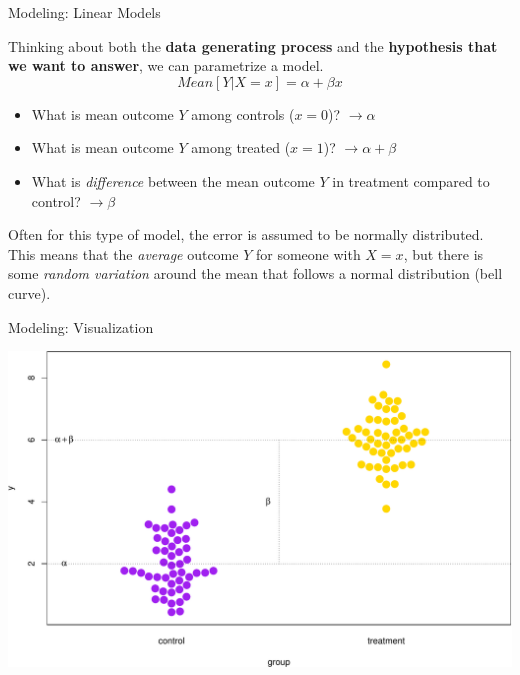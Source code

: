 \documentclass[ignorenonframetext,]{beamer}
\providecommand{\tightlist}{%
  \setlength{\itemsep}{0pt}\setlength{\parskip}{0pt}}
\begin{document}
\begin{frame}{Modeling: Linear Models}
\protect\hypertarget{modeling-linear-models-1}{}

Thinking about both the \textbf{data generating process} and the
\textbf{hypothesis that we want to answer}, we can parametrize a model.
\[
Mean[Y|X=x] = \alpha + \beta x
\]

\begin{itemize}
\tightlist
\item
  What is mean outcome \(Y\) among controls (\(x = 0\))? \(\to \alpha\)
\item
  What is mean outcome \(Y\) among treated (\(x = 1\))?
  \(\to \alpha + \beta\)
\item
  What is \emph{difference} between the mean outcome \(Y\) in treatment
  compared to control? \(\to \beta\)
\end{itemize}

Often for this type of model, the error is assumed to be normally
distributed. This means that the \emph{average} outcome \(Y\) for
someone with \(X = x\), but there is some \emph{random variation} around
the mean that follows a normal distribution (bell curve).

\end{frame}

\begin{frame}{Modeling: Visualization}
\protect\hypertarget{modeling-visualization}{}

\includegraphics{biostats_I_files/figure-beamer/unnamed-chunk-2-1.pdf}

\end{frame}
\end{document}
